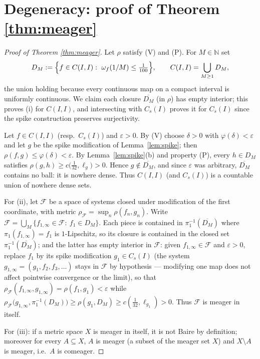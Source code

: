 ﻿\documentclass[11pt]{article}
\newcommand{\I}{I}
\newcommand{\Cs}{C_s(\I)}
\newcommand{\CI}{C(\I,\I)}
\begin{document}
\section{Degeneracy: proof of Theorem \ref{thm:meager}}\label{sec:meager}

\begin{proof}[Proof of Theorem \ref{thm:meager}]
Let $\rho$ satisfy (V) and (P).  For $M\in\mathbb N$ set
\[
D_M:=\Bigl\{f\in\CI:\ \omega_f(1/M)\le\tfrac1{100}\Bigr\},
\qquad
\CI=\bigcup_{M\ge1}D_M,
\]
the union holding because every continuous map on a compact interval is uniformly
continuous.  We claim each closure $\overline{D_M}$ (in $\rho$) has empty
interior; this proves (i) for $\CI$, and intersecting with $\Cs$ proves it for
$\Cs$ since the spike construction preserves surjectivity.

Let $f\in\CI$ (resp.\ $\Cs$) and $\varepsilon>0$.  By (V) choose $\delta>0$ with
$\varphi(\delta)<\varepsilon$ and let $g$ be the spike modification of
Lemma~\ref{lem:spike}; then $\rho(f,g)\le\varphi(\delta)<\varepsilon$.  By
Lemma~\ref{lem:spike}(b) and property (P), every $h\in D_M$ satisfies
$\rho(g,h)\ge c\bigl(\tfrac1{32},\ell_g\bigr)>0$.  Hence
$g\notin\overline{D_M}$, and since $\varepsilon$ was arbitrary,
$\overline{D_M}$ contains no ball: it is nowhere dense.  Thus $\CI$ (and $\Cs$) is
a countable union of nowhere dense sets.

For (ii), let $\mathcal F$ be a space of systems closed under modification of the
first coordinate, with metric
$\rho_{\mathcal F}=\sup_n\rho(f_n,g_n)$.  Write
$\mathcal F=\bigcup_M\{f_{1,\infty}\in\mathcal F:\ f_1\in D_M\}$.  Each piece is
contained in $\pi_1^{-1}(\overline{D_M})$ where $\pi_1(f_{1,\infty})=f_1$ is
$1$-Lipschitz, so its closure is contained in the closed set
$\pi_1^{-1}(\overline{D_M})$; and the latter has empty interior in $\mathcal F$:
given $f_{1,\infty}\in\mathcal F$ and $\varepsilon>0$, replace $f_1$ by its spike
modification $g_1\in\Cs$ (the system $g_{1,\infty}=(g_1,f_2,f_3,\dots)$ stays in
$\mathcal F$ by hypothesis --- modifying one map does not affect pointwise
convergence or the limit), so that
$\rho_{\mathcal F}(f_{1,\infty},g_{1,\infty})=\rho(f_1,g_1)<\varepsilon$ while
$\rho_{\mathcal F}\bigl(g_{1,\infty},\pi_1^{-1}(D_M)\bigr)\ge
\rho(g_1,D_M)\ge c(\tfrac1{32},\ell_{g_1})>0$.  Thus $\mathcal F$ is meager in
itself.

For (iii): if a metric space $X$ is meager in itself, it is not Baire by
definition; moreover for every $A\subseteq X$, $A$ is meager (a subset of the
meager set $X$) and $X\setminus A$ is meager, i.e.\ $A$ is comeager.
\end{proof}
\end{document}
